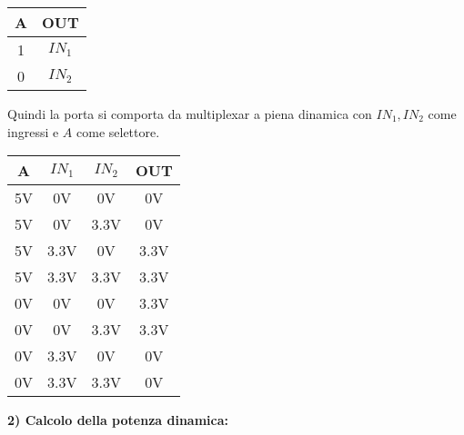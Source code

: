\documentclass[\main/main.tex]{subfiles}
\begin{document}
\begin{center}


\begin{tabular}{c | c}
    A & OUT\\
    \hline
    1 & $IN_1$\\
    0 & $IN_2$\\
\end{tabular}

Quindi la porta si comporta da multiplexar a piena dinamica
con $IN_1,IN_2$  come ingressi e $A$ come selettore.

\begin{tabular}{c c c| c }
    A & $IN_1$ & $IN_2$ & OUT\\
    \hline
    5V & 0V & 0V & 0V\\
    5V & 0V & 3.3V & 0V\\
    5V & 3.3V & 0V & 3.3V\\
    5V & 3.3V & 3.3V & 3.3V\\
    0V & 0V & 0V & 3.3V\\
    0V & 0V & 3.3V & 3.3V\\
    0V & 3.3V & 0V & 0V\\
    0V & 3.3V & 3.3V & 0V\\
\end{tabular}
\end{center}
\clearpage
\textbf{2) Calcolo della potenza dinamica:}
\end{document}
